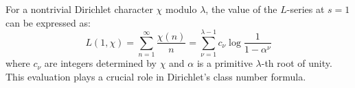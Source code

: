 For a nontrivial Dirichlet character $\chi$ modulo $\lambda$, the value of the $L$-series at $s=1$ can be expressed as:
$$L(1, \chi) = \sum_{n=1}^{\infty} \frac{\chi(n)}{n} = \sum_{\nu=1}^{\lambda-1} c_\nu \log \frac{1}{1 - \alpha^\nu}$$
where $c_\nu$ are integers determined by $\chi$ and $\alpha$ is a primitive $\lambda$-th root of unity. This evaluation plays a crucial role in Dirichlet's class number formula.
